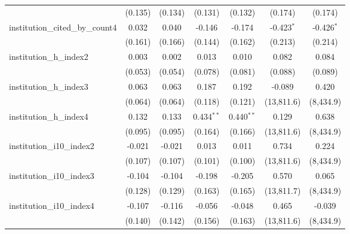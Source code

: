 \begin{tabular}{lcccccc}
                                         & (0.135)        & (0.134)        & (0.131)       & (0.132)       & (0.174)        & (0.174)\\   
   institution\_cited\_by\_count4        & 0.032          & 0.040          & -0.146        & -0.174        & -0.423$^{*}$   & -0.426$^{*}$\\   
                                         & (0.161)        & (0.166)        & (0.144)       & (0.162)       & (0.213)        & (0.214)\\   
   institution\_h\_index2                & 0.003          & 0.002          & 0.013         & 0.010         & 0.082          & 0.084\\   
                                         & (0.053)        & (0.054)        & (0.078)       & (0.081)       & (0.088)        & (0.089)\\   
   institution\_h\_index3                & 0.063          & 0.063          & 0.187         & 0.192         & -0.089         & 0.420\\   
                                         & (0.064)        & (0.064)        & (0.118)       & (0.121)       & (13,811.6)     & (8,434.9)\\   
   institution\_h\_index4                & 0.132          & 0.133          & 0.434$^{**}$  & 0.440$^{**}$  & 0.129          & 0.638\\   
                                         & (0.095)        & (0.095)        & (0.164)       & (0.166)       & (13,811.6)     & (8,434.9)\\   
   institution\_i10\_index2              & -0.021         & -0.021         & 0.013         & 0.011         & 0.734          & 0.224\\   
                                         & (0.107)        & (0.107)        & (0.101)       & (0.100)       & (13,811.6)     & (8,434.9)\\   
   institution\_i10\_index3              & -0.104         & -0.104         & -0.198        & -0.205        & 0.570          & 0.065\\   
                                         & (0.128)        & (0.129)        & (0.163)       & (0.165)       & (13,811.7)     & (8,434.9)\\   
   institution\_i10\_index4              & -0.107         & -0.116         & -0.056        & -0.048        & 0.465          & -0.039\\   
                                         & (0.140)        & (0.142)        & (0.156)       & (0.163)       & (13,811.6)     & (8,434.9)\\   

\end{tabular}

